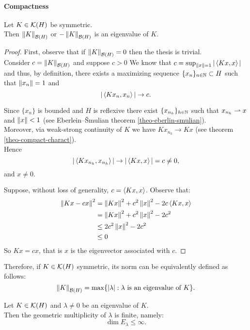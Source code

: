 \paragraph{Compactness}
\begin{prop}
	\label{prop-pm-norm-eigenvalue}
	Let $K \in \mathcal K(H)$ be symmetric.\\
	Then $\left\lVert K\right\rVert_{\mathcal B(H)}$ or $-\left\lVert K\right\rVert_{\mathcal B(H)}$ is an eigenvalue of $K$.
\end{prop}

\begin{proof}
	First, observe that if $\left\lVert K\right\rVert_{\mathcal B(H)}=0$ then the thesis is trivial.\\
	Consider $ c = \left\lVert K\right\rVert_{\mathcal B(H)}$ and suppose $c > 0$
	We know that $c = \sup_{\left\lVert x\right\rVert=1}|\left\langle Kx,x\right\rangle |$ and thus, by definition, there exists a maximizing sequence $\{x_n\}_{n\in\mathbb N} \subset H$ such that $\left\lVert x_n\right\rVert=1$ and 
	$$
	|\left\langle Kx_n,x_n\right\rangle | 
	\to c
	.
	$$
	
	Since $\{x_n\}$ is bounded and $H$ is reflexive there exist $\{x_{n_h}\}_{h \in \mathbb N}$ such that $x_{n_h} \rightharpoonup x$ and $\left\lVert x\right\rVert < 1$ (see Eberlein--Šmulian theorem \vref{theo-eberlin-smulian}).\\
	Moreover, via weak-strong continuity of $K$ we have $Kx_{n_h} \to Kx$ (see theorem \vref{theo-compact-charact}).\\
	Hence 
	$$
	|\left\langle Kx_{n_h}, x_{n_h}\right\rangle | 
	\to |\left\langle Kx,x\right\rangle |
	= c 
	\neq 0
	,$$
	and $x \neq 0$.
	
	Suppose, without loss of generality, $c = \left\langle Kx,x\right\rangle$. Observe that:
	\begin{align*}
		\left\lVert Kx-cx\right\rVert^2
		&=\left\lVert Kx\right\rVert^2+c^2\left\lVert x\right\rVert^2-2c\left\langle Kx,x\right\rangle \\
		&= \left\lVert Kx\right\rVert^2 + c^2\left\lVert x\right\rVert^2 - 2c^2\\
		& \leq 2c^2\left\lVert x\right\rVert^2 - 2 c^2 \\
		&\leq 0
	\end{align*}
	So $Kx = cx$, that is $x$ is the eigenvector associated with $c$.
\end{proof}

Therefore, if $K \in \mathcal K(H)$ symmetric, its norm can be equivalently defined as follows:
$$
\left\lVert K\right\rVert_{\mathcal B(H)}
= \max \{|\lambda| : \lambda \text{ is an eigenvalue of }K\}
.
$$

\begin{prop}
	\label{prop-eigenspace-finite-dim}
	Let $K \in \mathcal K(H)$ and $\lambda \neq 0$ be an eigenvalue of $K$. \\
	Then the geometric multiplicity of $\lambda$ is finite, namely:
	$$
	\dim E_\lambda
	\leq \infty
	.
	$$
\end{prop}

